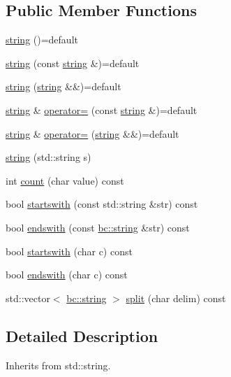 \subsection*{Public Member Functions}
\begin{DoxyCompactItemize}
\item 
\hyperlink{structbc_1_1string_a319ddebd8b82a18c2beb42f6ea6a7486}{string} ()=default
\item 
\hyperlink{structbc_1_1string_a8d252fb505358ae1114ce0f68f41cae0}{string} (const \hyperlink{structbc_1_1string}{string} \&)=default
\item 
\hyperlink{structbc_1_1string_ad6d97f4a6ff8d2ce60d01d30884570fd}{string} (\hyperlink{structbc_1_1string}{string} \&\&)=default
\item 
\hyperlink{structbc_1_1string}{string} \& \hyperlink{structbc_1_1string_a3874531b3865038fd50d992f681c4469}{operator=} (const \hyperlink{structbc_1_1string}{string} \&)=default
\item 
\hyperlink{structbc_1_1string}{string} \& \hyperlink{structbc_1_1string_ab37c2b8c95686510ad6344ac01fe8061}{operator=} (\hyperlink{structbc_1_1string}{string} \&\&)=default
\item 
\hyperlink{structbc_1_1string_ab6a5b41e2db3d0efef579df370105625}{string} (std\+::string s)
\item 
int \hyperlink{structbc_1_1string_ab434782ceccd7373dbf8bfdb546e35b0}{count} (char value) const
\item 
bool \hyperlink{structbc_1_1string_a4369807153dd45ee85ff11c384e3e573}{startswith} (const std\+::string \&str) const
\item 
bool \hyperlink{structbc_1_1string_aa939350fbd278d9a7848bccca012b065}{endswith} (const \hyperlink{structbc_1_1string}{bc\+::string} \&str) const
\item 
bool \hyperlink{structbc_1_1string_a6e70c02a3a308ceac1da6506bc4680f2}{startswith} (char c) const
\item 
bool \hyperlink{structbc_1_1string_ab1c88afd1da0390046facb85eb63a1a1}{endswith} (char c) const
\item 
std\+::vector$<$ \hyperlink{structbc_1_1string}{bc\+::string} $>$ \hyperlink{structbc_1_1string_ac4240df9fd8d9b4a082f85910e6af7cd}{split} (char delim) const
\end{DoxyCompactItemize}


\subsection{Detailed Description}
Inherits from std\+::string. 

